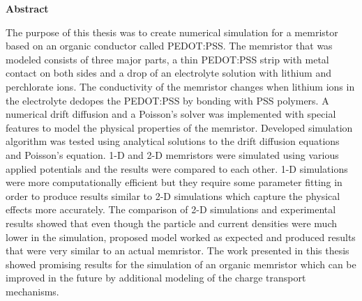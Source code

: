 \documentclass[11pt, a4paper, oneside]{Thesis} %
\begin{document}
\Large
\textbf{Abstract}
\newline
\begin{doublespace}
The purpose of this thesis was to create numerical simulation for a memristor based on an organic conductor called PEDOT:PSS. The memristor that was modeled consists of three major parts, a thin PEDOT:PSS strip with metal contact on both sides and a drop of an electrolyte solution with lithium and perchlorate ions. The conductivity of the memristor changes when lithium ions in the electrolyte dedopes the PEDOT:PSS by bonding with PSS polymers. A numerical drift diffusion and a Poisson's solver was implemented with special features to model the physical properties of the memristor. Developed simulation algorithm was tested using analytical solutions to the drift diffusion equations and Poisson's equation. 1-D and 2-D memristors were simulated using various applied potentials and the results were compared to each other. 1-D simulations were more computationally efficient but they require some parameter fitting in order to produce results similar to 2-D simulations which capture the physical effects more accurately. The comparison of 2-D simulations and experimental results showed that even though the particle and current densities were much lower in the simulation, proposed model worked as expected and produced results that were very similar to an actual memristor. The work presented in this thesis showed promising results for the simulation of an organic memristor which can be improved in the future by additional modeling of the charge transport mechanisms.
\end{doublespace}
\normalsize
\begin{doublespace}

\end{doublespace}



\newpage %



\clearpage %
\end{document}
